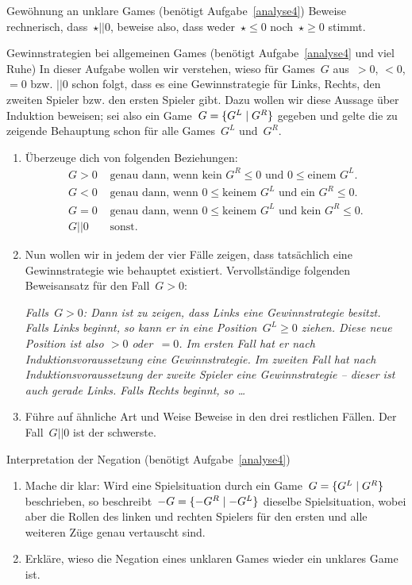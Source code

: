 \documentclass{zirkelblatt}
\newcommand{\fuzzy}{\mathrel{||}}
\begin{document}
\begin{aufgabe}{Gewöhnung an unklare Games (benötigt Aufgabe~\ref{analyse4})}
Beweise rechnerisch, dass~$\star \fuzzy 0$, beweise also, dass weder~$\star
\leq 0$ noch~$\star \geq 0$ stimmt.
\end{aufgabe}

\begin{aufgabe}{Gewinnstrategien bei allgemeinen Games (benötigt
Aufgabe~\ref{analyse4} und viel Ruhe)}
\label{gewinnstrategien}
In dieser Aufgabe wollen wir verstehen, wieso für Games~$G$ aus~$> 0$, $<
0$, $= 0$ bzw. $\fuzzy 0$ schon folgt, dass es eine Gewinnstrategie für Links,
Rechts, den zweiten Spieler bzw. den ersten Spieler gibt. Dazu wollen wir diese
Aussage über Induktion beweisen; sei also ein Game~$G = \{ G^L \mathrel{|} G^R \}$
gegeben und gelte die zu zeigende Behauptung schon für alle Games~$G^L$
und~$G^R$.
\begin{enumerate}
\item Überzeuge dich von folgenden Beziehungen:
\begin{align*}
  G > 0 &\text{ genau dann, wenn $\text{kein $G^R$} \leq 0$ und~$0 \leq \text{einem $G^L$}$.} \\
  G < 0 &\text{ genau dann, wenn $0 \leq \text{keinem $G^L$}$ und~$\text{ein $G^R$} \leq 0$.} \\
  G = 0 &\text{ genau dann, wenn $0 \leq \text{keinem $G^L$}$ und~$\text{kein $G^R$} \leq 0$.} \\
  G \fuzzy 0 &\text{ sonst.}
\end{align*}
\item Nun wollen wir in jedem der vier Fälle zeigen, dass tatsächlich eine Gewinnstrategie
wie behauptet existiert. Vervollständige folgenden Beweisansatz für den Fall~$G
> 0$:

\emph{Falls~$G > 0$: Dann ist zu zeigen, dass Links eine
Gewinnstrategie besitzt. Falls Links beginnt, so kann er in eine Position~$G^L
\geq 0$ ziehen. Diese neue Position ist also $> 0$ oder~$= 0$. Im ersten Fall
hat er nach Induktionsvoraussetzung eine Gewinnstrategie. Im zweiten Fall hat
nach Induktionsvoraussetzung der zweite Spieler eine Gewinnstrategie -- dieser
ist auch gerade Links. Falls Rechts beginnt, so \ldots}
\item Führe auf ähnliche Art und Weise Beweise in den drei restlichen Fällen.
Der Fall~$G \fuzzy 0$ ist der schwerste.
\end{enumerate}
\end{aufgabe}

\begin{aufgabe}{Interpretation der Negation (benötigt Aufgabe~\ref{analyse4})}
\label{game-negation}
\begin{enumerate}
\item Mache dir klar: Wird eine Spielsituation durch ein Game~$G =
\{ G^L \mathrel{|} G^R \}$ beschrieben,
so beschreibt~$-G = \{ -G^R \mathrel{|} -G^L \}$ dieselbe Spielsituation, wobei aber die Rollen des linken und
rechten Spielers für den ersten und alle weiteren Züge genau vertauscht sind.
\item Erkläre, wieso die Negation
eines unklaren Games wieder ein unklares Game ist.
\end{enumerate}
\end{aufgabe}
\end{document}
